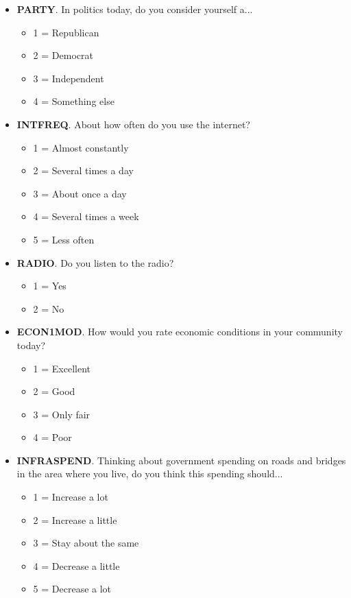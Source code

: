 \documentclass[11pt]{article}
\begin{document}
\begin{itemize}
    \item \textbf{PARTY}. In politics today, do you consider yourself a...
    \begin{itemize}
        \item 1 = Republican
        \item 2 = Democrat
        \item 3 = Independent
        \item 4 = Something else
    \end{itemize}
    
    \item \textbf{INTFREQ}. About how often do you use the internet?
    \begin{itemize}
        \item 1 = Almost constantly
        \item 2 = Several times a day
        \item 3 = About once a day
        \item 4 = Several times a week
        \item 5 = Less often
    \end{itemize}
    
    \item \textbf{RADIO}. Do you listen to the radio?
    \begin{itemize}
        \item 1 = Yes
        \item 2 = No
    \end{itemize}
    
    \item \textbf{ECON1MOD}. How would you rate economic conditions in your community today?
    \begin{itemize}
        \item 1 = Excellent
        \item 2 = Good
        \item 3 = Only fair
        \item 4 = Poor
    \end{itemize}
    
    \item \textbf{INFRASPEND}. Thinking about government spending on roads and bridges in the area where you live, do you think this spending should...
    \begin{itemize}
        \item 1 = Increase a lot
        \item 2 = Increase a little
        \item 3 = Stay about the same
        \item 4 = Decrease a little
        \item 5 = Decrease a lot
    \end{itemize}
    

\end{itemize}
\end{document}

